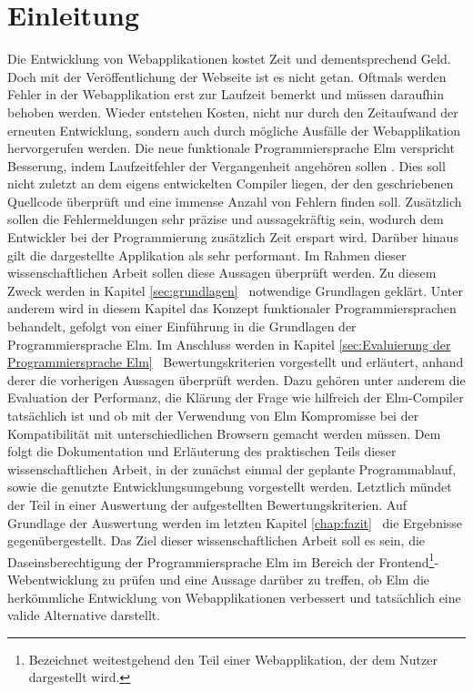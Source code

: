 \chapter{Einleitung}
\label{sec:einleitung}
Die Entwicklung von Webapplikationen kostet Zeit und dementsprechend Geld. Doch mit der Veröffentlichung der Webseite ist es nicht getan. Oftmals werden Fehler in der Webapplikation erst zur Laufzeit bemerkt und müssen daraufhin behoben werden. Wieder entstehen Kosten, nicht nur durch den Zeitaufwand der erneuten Entwicklung, sondern auch durch mögliche Ausfälle der Webapplikation hervorgerufen werden. Die neue funktionale Programmiersprache Elm verspricht Besserung, indem Laufzeitfehler der Vergangenheit angehören sollen \cite[Vgl. f.]{elm-no-runtime-errors}. Dies soll nicht zuletzt an dem eigens entwickelten Compiler liegen, der den geschriebenen Quellcode überprüft und eine immense Anzahl von Fehlern finden soll. Zusätzlich sollen die Fehlermeldungen sehr präzise und aussagekräftig sein, wodurch dem Entwickler bei der Programmierung zusätzlich Zeit erspart wird. Darüber hinaus gilt die dargestellte Applikation als sehr performant.
Im Rahmen dieser wissenschaftlichen Arbeit sollen diese Aussagen überprüft werden. Zu diesem Zweck werden in Kapitel \ref{sec:grundlagen} \glqq{}\grqq~notwendige Grundlagen geklärt. Unter anderem wird in diesem Kapitel das Konzept funktionaler Programmiersprachen behandelt, gefolgt von einer Einführung in die Grundlagen der Programmiersprache Elm. Im Anschluss werden in Kapitel \ref{sec:Evaluierung der Programmiersprache Elm} \glqq{}\grqq~Bewertungskriterien vorgestellt und erläutert, anhand derer die vorherigen Aussagen überprüft werden. Dazu gehören unter anderem die Evaluation der Performanz, die Klärung der Frage wie hilfreich der Elm-Compiler tatsächlich ist und ob mit der Verwendung von Elm Kompromisse bei der Kompatibilität mit unterschiedlichen Browsern gemacht werden müssen. Dem folgt die Dokumentation und Erläuterung des praktischen Teils dieser wissenschaftlichen Arbeit, in der zunächst einmal der geplante Programmablauf, sowie die genutzte Entwicklungsumgebung vorgestellt werden.  Letztlich mündet der Teil in einer Auswertung der aufgestellten Bewertungskriterien. Auf Grundlage der Auswertung werden im letzten Kapitel \ref{chap:fazit} \glqq{}\grqq~die Ergebnisse gegenübergestellt. Das Ziel dieser wissenschaftlichen Arbeit soll es sein, die Daseinsberechtigung der Programmiersprache Elm im Bereich der Frontend\footnote{Bezeichnet weitestgehend den Teil einer Webapplikation, der dem Nutzer dargestellt wird.}-Webentwicklung zu prüfen und eine Aussage darüber zu treffen, ob Elm die herkömmliche Entwicklung von Webapplikationen verbessert und tatsächlich eine valide Alternative darstellt.